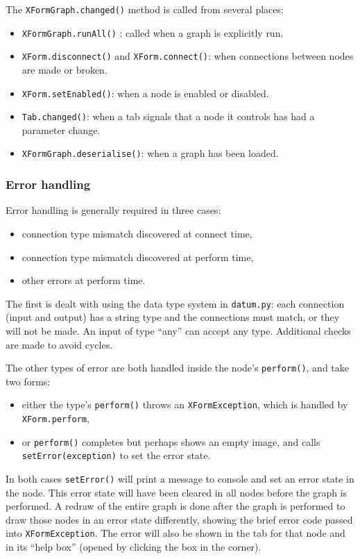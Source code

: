The \texttt{XFormGraph.changed()} method is called from several places:
\begin{itemize}
\item \texttt{XFormGraph.runAll()} : called when a graph is explicitly run.
\item \texttt{XForm.disconnect()} and \texttt{XForm.connect()}: when connections between nodes are made or broken.
\item \texttt{XForm.setEnabled()}: when a node is enabled or disabled.
\item \texttt{Tab.changed()}: when a tab signals that a node it controls has had a parameter change.
\item \texttt{XFormGraph.deserialise()}: when a graph has been loaded.
\end{itemize}

\clearpage
\subsubsection{Error handling}
\label{errorhandling}
Error handling is generally required in three cases:
\begin{itemize}
\item connection type mismatch discovered at connect time,
\item connection type mismatch discovered at perform time,
\item other errors at perform time.
\end{itemize}
The first is dealt with using the data type system
in \texttt{datum.py}: each connection (input and output) has a string
type and the connections must match, or they will not be made. An input
of type ``any'' can accept any type. Additional checks are made to avoid
cycles.

The other types of error are both handled inside the node's \texttt{perform()},
and take two forms:
\begin{itemize}
\item either the type's \texttt{perform()} throws an \texttt{XFormException}, which
is handled by \texttt{XForm.perform},
\item or \texttt{perform()} completes but perhaps shows an empty image,
and calls \texttt{setError(exception)} to set the error state.
\end{itemize}
In both cases \texttt{setError()} will print a message to console and
set an error state in the node. This error state
will have been cleared in all nodes before the graph is performed. A redraw of the
entire graph is done after the graph is performed to
draw those nodes in an error state differently, showing the 
brief error code passed into \texttt{XFormException}. The error
will also be shown in the tab for that node and in its ``help box''
(opened by clicking the box in the corner).


